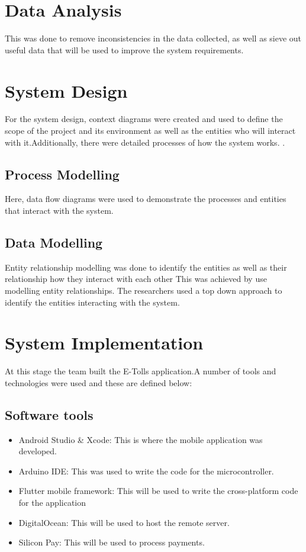 \section{Data Analysis}
This was done to remove inconsistencies in the data collected, as well as sieve out useful data that will be used to improve the system requirements.


\section{System Design}
For the system design, context diagrams were created and used to define the scope of the project and its environment as well as the entities who will interact with it.Additionally, there were detailed processes of how the system works. \cite{rumbaugh_object-oriented_1991}.

\subsection{Process Modelling}
Here, data flow diagrams were used to demonstrate the processes and entities that interact with the system.

\subsection{Data Modelling}
Entity relationship modelling was done to identify the entities as well as their relationship how they interact with each other
This was achieved by use modelling entity relationships. The researchers used a top down approach to identify the entities interacting with the system.


\section{System Implementation}
At this stage the team built the E-Tolls application.A number of tools and technologies were used and these are defined below:

\subsection{Software tools}
\begin{itemize}
    \item  Android Studio & Xcode: This is where the mobile application was developed.
    \item Arduino IDE: This was used to write the code for the microcontroller.
    \item Flutter mobile framework: This will be used to write the cross-platform code for the application
    \item DigitalOcean: This will be used to host the remote server.
    \item Silicon Pay: This will be used to process payments.
\end{itemize}

